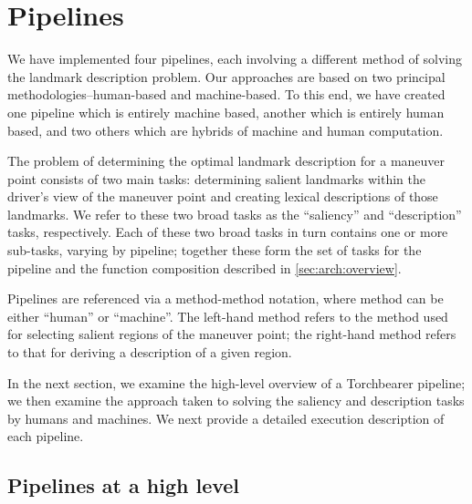 \section{Pipelines}
We have implemented four pipelines, each involving a different method of solving the landmark description problem. Our approaches are based on two principal methodologies--human-based and machine-based. To this end, we have created one pipeline which is entirely machine based, another which is entirely human based, and two others which are hybrids of machine and human computation.

The problem of determining the optimal landmark description for a maneuver point consists of two main tasks: determining salient landmarks within the driver’s view of the maneuver point and creating lexical descriptions of those landmarks. We refer to these two broad tasks as the “saliency” and “description” tasks, respectively. Each of these two broad tasks in turn contains one or more sub-tasks, varying by pipeline; together these form the set of tasks for the pipeline and the function composition described in \ref{sec:arch:overview}. 

Pipelines are referenced via a method-method notation, where method can be either “human” or “machine”. The left-hand method refers to the method used for selecting salient regions of the maneuver point; the right-hand method refers to that for deriving a description of a given region.

In the next section, we examine the high-level overview of a Torchbearer pipeline; we then examine the approach taken to solving the saliency and description tasks by humans and machines. We next provide a detailed execution description of each pipeline.

\subsection{Pipelines at a high level}
	
